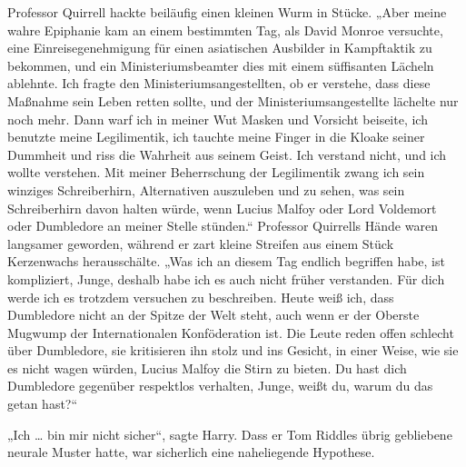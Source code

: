 Professor Quirrell hackte beiläufig einen kleinen Wurm in Stücke.
„Aber meine wahre Epiphanie kam an einem bestimmten Tag, als David Monroe versuchte, eine Einreisegenehmigung für einen asiatischen Ausbilder in Kampftaktik zu bekommen, und ein Ministeriumsbeamter dies mit einem süffisanten Lächeln ablehnte. Ich fragte den Ministeriumsangestellten, ob er verstehe, dass diese Maßnahme sein Leben retten sollte, und der Ministeriumsangestellte lächelte nur noch mehr. Dann warf ich in meiner Wut Masken und Vorsicht beiseite, ich benutzte meine Legilimentik, ich tauchte meine Finger in die Kloake seiner Dummheit und riss die Wahrheit aus seinem Geist. Ich verstand nicht, und ich wollte verstehen. Mit meiner Beherrschung der Legilimentik zwang ich sein winziges Schreiberhirn, Alternativen auszuleben und zu sehen, was sein Schreiberhirn davon halten würde, wenn Lucius Malfoy oder Lord Voldemort oder Dumbledore an meiner Stelle stünden.“
Professor Quirrells Hände waren langsamer geworden, während er zart kleine Streifen aus einem Stück Kerzenwachs herausschälte.
„Was ich an diesem Tag endlich begriffen habe, ist kompliziert, Junge, deshalb habe ich es auch nicht früher verstanden. Für dich werde ich es trotzdem versuchen zu beschreiben. Heute weiß ich, dass Dumbledore nicht an der Spitze der Welt steht, auch wenn er der Oberste Mugwump der Internationalen Konföderation ist. Die Leute reden offen schlecht über Dumbledore, sie kritisieren ihn stolz und ins Gesicht, in einer Weise, wie sie es nicht wagen würden, Lucius Malfoy die Stirn zu bieten. Du hast dich Dumbledore gegenüber respektlos verhalten, Junge, weißt du, warum du das getan hast?“

„Ich … bin mir nicht sicher“, sagte Harry.
Dass er Tom Riddles übrig gebliebene neurale Muster hatte, war sicherlich eine naheliegende Hypothese.

